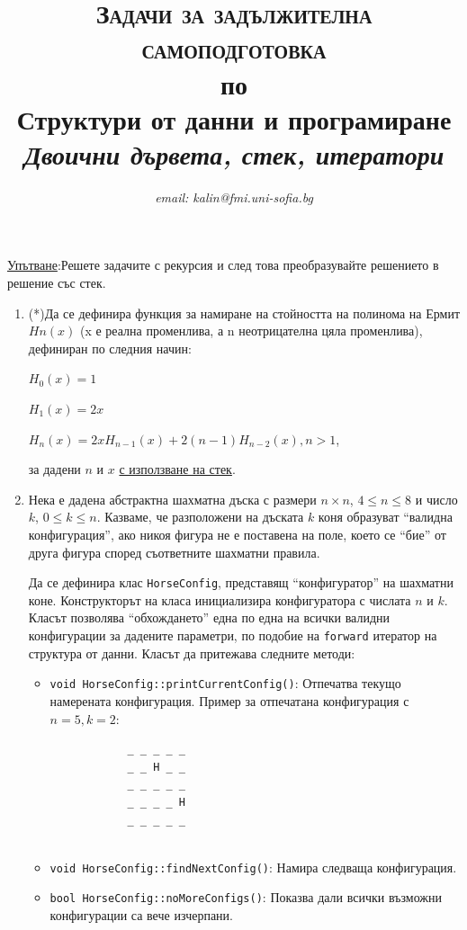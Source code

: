 \documentclass[12pt,a4paper]{article}
\author{\textit{email: kalin@fmi.uni-sofia.bg}}
\title{\textsc{Задачи за задължителна самоподготовка} \\
по \\
Структури от данни и програмиране\\
\textit{Двоични дървета, стек, итератори}}
\begin{document}
\maketitle

 \underline{Упътване}:Решете задачите с рекурсия и след това преобразувайте решението в решение със стек.



\begin{enumerate}

	\item (*)Да се дефинира функция за намиране на стойността на полинома на Ермит $Hn(x)$ (x е реална променлива, а n неотрицателна цяла променлива), дефиниран по следния начин:

	$H_0(x)=1$

	$H_1(x)=2x$

	$H_n(x)=2xH_{n-1}(x)+2(n-1)H_{n-2}(x), n>1$,

	за дадени $n$ и $x$ \underline{с използване на стек}.


	\item Нека е дадена абстрактна шахматна дъска с размери $n \times n$, $4 \le n \le 8$ и число $k$, $0 \le k \le n$. Казваме, че разположени на дъската  $k$ коня образуват ``валидна конфигурация'', ако никоя фигура не е поставена на поле, което се ``бие'' от друга фигура според съответните шахматни правила. 

	Да се дефинира клас \texttt{HorseConfig}, представящ ``конфигуратор'' на шахматни коне. Конструкторът на класа инициализира конфигуратора с числата $n$ и $k$. Класът позволява ``обхождането'' една по една на всички валидни конфигурации за дадените параметри, по подобие на \texttt{forward} итератор на структура от данни. Класът да притежава следните методи:

	\begin{itemize}
		\item \texttt{void HorseConfig::printCurrentConfig()}: Отпечатва текущо намерената конфигурация.
			Пример за отпечатана конфигурация с $n=5, k=2$:
			\begin{verbatim}
			_ _ _ _ _
			_ _ H _ _
			_ _ _ _ _
			_ _ _ _ H
			_ _ _ _ _
				
			\end{verbatim}		
		\item \texttt{void HorseConfig::findNextConfig()}: Намира следваща конфигурация.
		\item \texttt{bool HorseConfig::noMoreConfigs()}: Показва дали всички възможни конфигурации са вече изчерпани.
	\end{itemize}



\end{enumerate}
\end{document}

